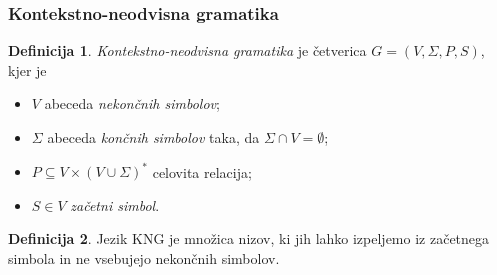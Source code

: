\documentclass{beamer}
\theoremstyle{definition}
\newtheorem{definicija}{Definicija}[section]
\begin{document}
\begin{frame}
    \frametitle{Kontekstno-neodvisna gramatika}
    \begin{definicija}
        \emph{Kontekstno-neodvisna gramatika} je četverica $G = (V, \Sigma, P, S)$,
        kjer je
        \begin{itemize}
            \item $V$ abeceda \emph{nekončnih simbolov};
            \item $\Sigma$ abeceda \emph{končnih simbolov} taka, da $\Sigma \cap V = \emptyset$;
            \item $P \subseteq V \times ( V \cup \Sigma )^*$ celovita relacija;
            \item $S \in V$ \emph{začetni simbol}.
        \end{itemize}
    \end{definicija}
    \pause
    \begin{definicija}
        Jezik KNG je množica nizov, ki jih lahko izpeljemo iz začetnega simbola in 
        ne vsebujejo nekončnih simbolov.
    \end{definicija}
\end{frame}
\end{document}
